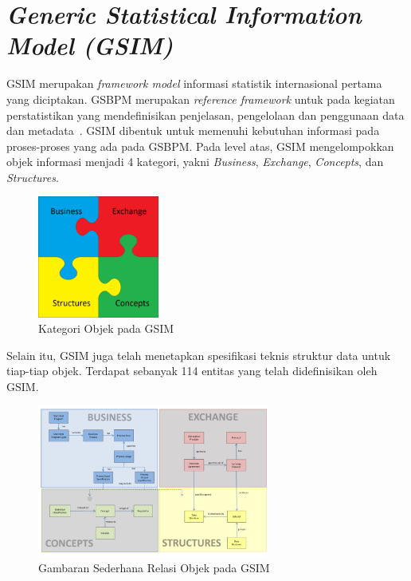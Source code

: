\section{\textit{Generic Statistical Information Model (GSIM)}}
GSIM merupakan \textit{framework model} informasi statistik internasional pertama yang diciptakan. GSBPM merupakan \textit{reference framework} untuk  pada kegiatan perstatistikan yang mendefinisikan penjelasan, pengelolaan dan penggunaan data dan metadata~\cite{_gsim_????}. GSIM dibentuk untuk memenuhi kebutuhan informasi pada proses-proses yang ada pada GSBPM. Pada level atas, GSIM mengelompokkan objek informasi menjadi 4 kategori, yakni \textit{Business}, \textit{Exchange}, \textit{Concepts}, dan \textit{Structures}.

\begin{figure}[H]
    \centering
    \includegraphics[height=4cm]{images/gsim}
    \caption{Kategori Objek pada GSIM}
    \label{fig:gsim}
\end{figure}

Selain itu, GSIM juga telah menetapkan spesifikasi teknis struktur data untuk tiap-tiap objek. Terdapat sebanyak 114 entitas yang telah didefinisikan oleh GSIM.

\begin{figure}[H]
    \centering
    \includegraphics[height=5cm]{images/object-relation-gsim}
    \caption{Gambaran Sederhana Relasi Objek pada GSIM}
    \label{fig:object-relation-gsim}
\end{figure}

